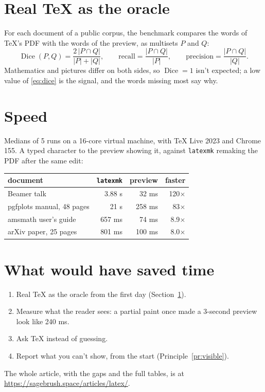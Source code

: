 \documentclass[11pt]{article}
\newcommand{\dice}{\operatorname{Dice}}
\begin{document}
\section{Real \TeX{} as the oracle}\label{sec:oracle}

For each document of a public corpus, the benchmark compares the words of
\TeX{}'s PDF with the words of the preview, as multisets $P$ and $Q$:
\begin{equation}\label{eq:dice}
  \dice(P, Q) = \frac{2\,|P \cap Q|}{|P| + |Q|},
  \qquad
  \text{recall} = \frac{|P \cap Q|}{|P|},
  \qquad
  \text{precision} = \frac{|P \cap Q|}{|Q|}.
\end{equation}
Mathematics and pictures differ on both sides, so $\dice = 1$ isn't expected; a
low value of \eqref{eq:dice} is the signal, and the words missing most say why.

\section{Speed}\label{sec:speed}

Medians of 5 runs on a 16-core virtual machine, with \TeX{} Live 2023 and
Chrome 155. A typed character to the preview showing it, against
\texttt{latexmk} remaking the PDF after the same edit:

\begin{center}
\begin{tabular}{lrrr}
\hline
document & \texttt{latexmk} & preview & faster \\
\hline
Beamer talk & 3.88 s & 32 ms & 120$\times$ \\
pgfplots manual, 48 pages & 21 s & 258 ms & 83$\times$ \\
amsmath user's guide & 657 ms & 74 ms & 8.9$\times$ \\
arXiv paper, 25 pages & 801 ms & 100 ms & 8.0$\times$ \\
\hline
\end{tabular}
\end{center}

\section{What would have saved time}\label{sec:lessons}

\begin{enumerate}
  \item Real \TeX{} as the oracle from the first day (Section~\ref{sec:oracle}).
  \item Measure what the reader sees: a partial paint once made a 3-second
    preview look like 240 ms.
  \item Ask \TeX{} instead of guessing.
  \item Report what you can't show, from the start (Principle~\ref{pr:visible}).
\end{enumerate}

The whole article, with the gaps and the full tables, is at
\url{https://sagebrush.space/articles/latex/}.
\end{document}
